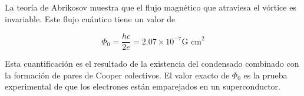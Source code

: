 \documentclass[a4paper,conference]{IEEEtran}
\begin{document}

La teor\'{i}a de Abrikosov muestra que el flujo magn\'{e}tico que atraviesa el
v\'{o}rtice es invariable. Este flujo cu\'{a}ntico tiene un valor de 

\begin{equation}
				\label{eq:cuanto_flujo_magnetico}
				\Phi_0 = \frac{hc}{2e} = 2.07 \times 10^{-7} \text{G cm}^2
\end{equation}


\noindent Esta cuantificaci\'{o}n es el resultado de la existencia del
condensado combinado con la formaci\'{o}n de pares de Cooper colectivos. El
valor exacto de $\Phi_0$ es la prueba experimental de que los electrones est\'{a}n
emparejados en un superconductor.

\end{document}
